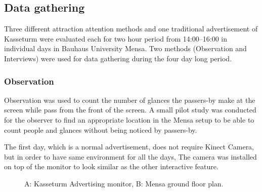 \subsection{Data gathering}
Three different attraction attention methods and one traditional advertisement of Kasseturm were evaluated each for two hour period from 14:00--16:00 in individual days in Bauhaus University Mensa. Two methods (Observation and Interviews) were used for data gathering during the four day long period.

\subsubsection{Observation}
Observation was used to count the number of glances the passers-by make at the screen while pass from the front of the screen. A small pilot study was conducted for the observer to find an appropriate location in the Mensa setup to be able to count people and glances without being noticed by passers-by.

The first day, which is a normal advertisement, does not require Kinect Camera, but in order to have same environment for all the days, The camera was installed on top of the monitor to look similar as the other interactive feature.

\begin{figure}[H]
    \centering
    \caption{A: Kasseturm Advertising monitor,  B: Mensa ground floor plan. }%
    \label{fig:observation_env}%
\end{figure}

